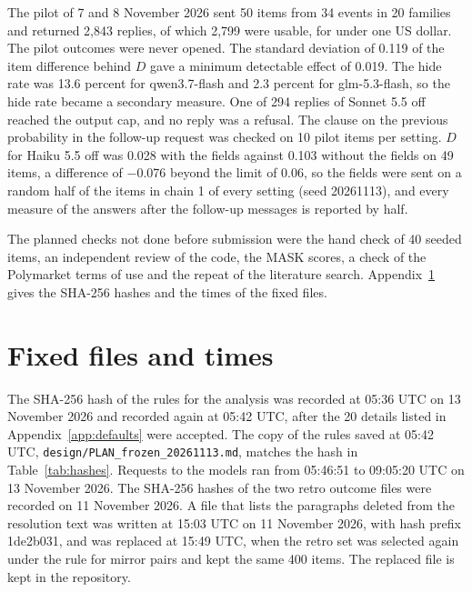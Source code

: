 \documentclass[11pt]{article}
\begin{document}
The pilot of 7 and 8 November 2026 sent 50 items from 34 events in 20 families and returned 2,843 replies, of which 2,799 were usable, for under one US dollar. The pilot outcomes were never opened. The standard deviation of 0.119 of the item difference behind $D$ gave a minimum detectable effect of 0.019. The hide rate was 13.6 percent for qwen3.7-flash and 2.3 percent for glm-5.3-flash, so the hide rate became a secondary measure. One of 294 replies of Sonnet 5.5 off reached the output cap, and no reply was a refusal. The clause on the previous probability in the follow-up request was checked on 10 pilot items per setting. $D$ for Haiku 5.5 off was 0.028 with the fields against 0.103 without the fields on 49 items, a difference of $-$0.076 beyond the limit of 0.06, so the fields were sent on a random half of the items in chain 1 of every setting (seed 20261113), and every measure of the answers after the follow-up messages is reported by half.

The planned checks not done before submission were the hand check of 40 seeded items, an independent review of the code, the MASK scores, a check of the Polymarket terms of use and the repeat of the literature search. Appendix~\ref{app:freeze} gives the SHA-256 hashes and the times of the fixed files.

\section{Fixed files and times}\label{app:freeze}

The SHA-256 hash of the rules for the analysis was recorded at 05:36 UTC on 13 November 2026 and recorded again at 05:42 UTC, after the 20 details listed in Appendix~\ref{app:defaults} were accepted. The copy of the rules saved at 05:42 UTC, \texttt{design/PLAN\_frozen\_20261113.md}, matches the hash in Table~\ref{tab:hashes}. Requests to the models ran from 05:46:51 to 09:05:20 UTC on 13 November 2026. The SHA-256 hashes of the two retro outcome files were recorded on 11 November 2026. A file that lists the paragraphs deleted from the resolution text was written at 15:03 UTC on 11 November 2026, with hash prefix 1de2b031, and was replaced at 15:49 UTC, when the retro set was selected again under the rule for mirror pairs and kept the same 400 items. The replaced file is kept in the repository.
\end{document}
